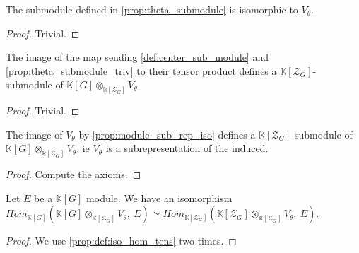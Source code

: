 \begin{proposition}
    \label{prop:theta_submodule_triv}
    \leanok 
    The submodule defined in \ref{prop:theta_submodule} is isomorphic to $V_\theta$.
\end{proposition}
\begin{proof}
    \leanok
    Trivial.
\end{proof}

\begin{proposition}
    \label{prop:center_times_theta_submodule}
    \leanok 
    The image of the map sending \ref{def:center_sub_module} and \ref{prop:theta_submodule_triv}
    to their tensor product defines a $\mathbb{K}[\mathcal{Z}_G]$-submodule of 
    $\mathbb{K}[G]\otimes_{\mathbb{k}[\mathcal{Z}_G]}V_\theta$.
\end{proposition}
\begin{proof}
    \leanok
    Trivial.
\end{proof}

\begin{proposition}
    \label{prop:subsubsub}
    \leanok 
    The image of $V_\theta$ by \ref{prop:module_sub_rep_iso} defines a $\mathbb{K}[\mathcal{Z}_G]$-submodule of 
    $\mathbb{K}[G]\otimes_{\mathbb{k}[\mathcal{Z}_G]}V_\theta$, ie $V_\theta$ is a 
    subrepresentation of the induced.
\end{proposition}
\begin{proof}
    \leanok
    Compute the axioms.
\end{proof}

\begin{proposition}
    \label{prop:induced_property}
    \leanok 
    Let $E$ be a $\mathbb{K}[G]$ module. We have an isomorphism $Hom_{\mathbb{K}[G]}
    \left(\mathbb{K}[G]\otimes_{\mathbb{K}[\mathcal{Z}_G]}V_\theta,\ E\right)\simeq Hom_{\mathbb{K}[\mathcal{Z}_G]}
    \left(\mathbb{K}[\mathcal{Z}_G]\otimes_{\mathbb{K}[\mathcal{Z}_G]}V_\theta,\ E\right)$.
\end{proposition}
\begin{proof}
    \leanok
    We use \ref{prop:def:iso_hom_tens} two times.
\end{proof}

